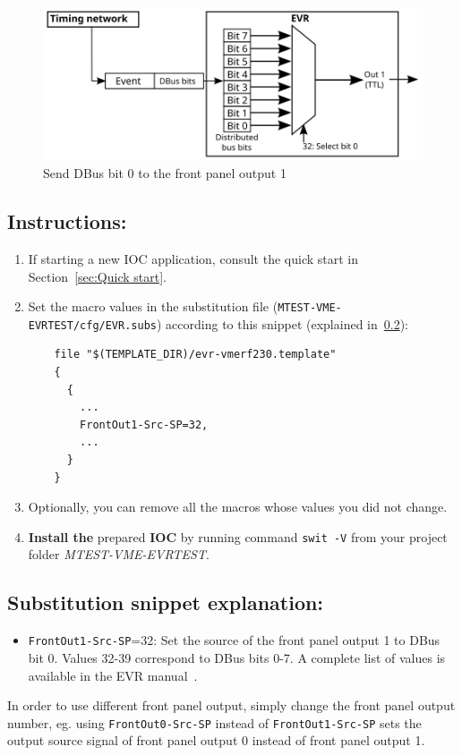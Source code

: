 \documentclass[12pt,a4paper]{article}
\begin{document}
\begin{figure}[H]
	\centering
	\includegraphics[]{./img/dbus}
	\caption{Send DBus bit 0 to the front panel output 1}
	\label{fig:dbus}
\end{figure}

\subsection{Instructions:}
\begin{enumerate}
	\item If starting a new IOC application, consult the quick start in Section~\ref{sec:Quick start}.
	
	\item Set the macro values in the substitution file (\texttt{MTEST-VME-EVRTEST/cfg/EVR.subs}) according to this snippet (explained in~\ref{sec:explain_dbus}):
\begin{verbatim}
	file "$(TEMPLATE_DIR)/evr-vmerf230.template"
	{
	  {
	    ...
	    FrontOut1-Src-SP=32,
	    ...
	  }
	}
\end{verbatim}

	\item Optionally, you can remove all the macros whose values you did not change. 
	\item \textbf{Install the} prepared \textbf{IOC} by running command \texttt{swit -V} from your project folder \textit{MTEST-VME-EVRTEST}.
\end{enumerate}

\subsection{Substitution snippet explanation:}\label{sec:explain_dbus}
\begin{itemize}
	\item \texttt{FrontOut1-Src-SP}=32: Set the source of the front panel output 1  to DBus bit 0. Values 32-39 correspond to DBus bits 0-7. A complete list of values is available in the EVR manual~\cite{evr_manual}.
\end{itemize}

In order to use different front panel output, simply change the front panel output number, eg. using \texttt{FrontOut0-Src-SP} instead of \texttt{FrontOut1-Src-SP} sets the output source signal of front panel output 0 instead of front panel output 1.



\end{document}
